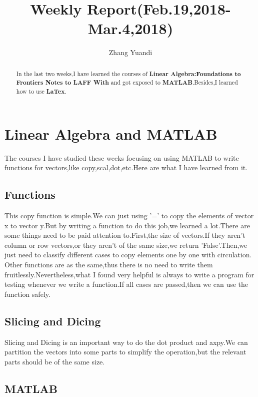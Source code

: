 \documentclass{article}
\title{Weekly Report(Feb.19,2018-Mar.4,2018)}
\author{Zhang Yuandi}
\begin{document}
\maketitle

\begin{abstract}
In the last two weeks,I have learned the courses of \textbf{Linear Algebra:Foundations to Frontiers Notes to LAFF With} and got exposed to \textbf{MATLAB}.Besides,I learned how to use \textbf{LaTex}.
\end{abstract}

\section{Linear Algebra and MATLAB}

The courses I have studied these weeks focusing on using MATLAB to write functions for vectors,like copy,scal,dot,etc.Here are what I have learned from it.

\subsection{Functions}

This copy function is simple.We can just using '=' to copy the elements of vector x to vector y.But by writing a function to do this job,we learned a lot.There are some things need to be paid attention to.First,the size of vectors.If they aren't column or row vectors,or they aren't of the same size,we return 'False'.Then,we just need to classify different cases to copy elements one by one with circulation.\\
\indent Other functions are as the same,thus there is no need to write them fruitlessly.Nevertheless,what I found very helpful is always to write a program for testing whenever we write a function.If all cases are passed,then we can use the function safely.

\subsection{Slicing and Dicing}

Slicing and Dicing is an important way to do the dot product and axpy.We can partition the vectors into some parts to simplify the operation,but the relevant parts should be of the same size.
   
\subsection{MATLAB}
\end{document}
